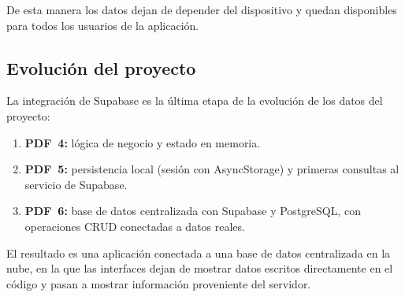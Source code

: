 \begin{figure}[H]
\centering
\end{figure}

De esta manera los datos dejan de depender del dispositivo y quedan
disponibles para todos los usuarios de la aplicaci\'on.

\subsection{Evoluci\'on del proyecto}

La integraci\'on de Supabase es la \'ultima etapa de la evoluci\'on de
los datos del proyecto:

\begin{enumerate}
  \item \textbf{PDF~4:} l\'ogica de negocio y estado en memoria.
  \item \textbf{PDF~5:} persistencia local (sesi\'on con AsyncStorage)
    y primeras consultas al servicio de Supabase.
  \item \textbf{PDF~6:} base de datos centralizada con Supabase y
    PostgreSQL, con operaciones CRUD conectadas a datos reales.
\end{enumerate}

El resultado es una aplicaci\'on conectada a una base de datos centralizada
en la nube, en la que las interfaces dejan de mostrar datos escritos
directamente en el c\'odigo y pasan a mostrar informaci\'on proveniente
del servidor.